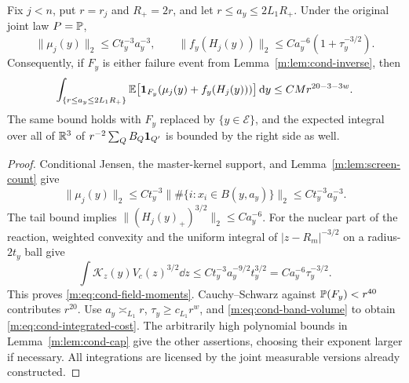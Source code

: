 \begin{lemma}\label{m:lem:cond-moments}
Fix $j<n$, put $r=r_j$ and $R_+=2r$, and let
$r\le a_y\le2L_1R_+$. Under the original joint law $P=\mathbb P$,
\begin{equation}\label{m:eq:cond-field-moments}
 \|\mu_j(y)\|_2\le Ct_y^{-3}a_y^{-3},\qquad
 \|f_y(H_j(y))\|_2
        \le Ca_y^{-6}(1+\tau_y^{-3/2}).
\end{equation}
Consequently, if $F_y$ is either failure event from
Lemma~\ref{m:lem:cond-inverse}, then
\begin{equation}\label{m:eq:cond-integrated-cost}
 \int_{\{r\le a_y\le2L_1R_+\}}
 \mathbb E\big[\mathbf 1_{F_y}(\mu_j(y)+f_y(H_j(y)))\big]\,\mathrm d y
       \le CM r^{20-3-3w}.
\end{equation}
The same bound holds with $F_y$ replaced by $\{y\in\mathcal E\}$,
and the expected integral over all of $\mathbb R^3$ of
$r^{-2}\sum_QB_Q\mathbf 1_{Q'}$ is bounded by the right side as well.
\end{lemma}

\begin{proof}
Conditional Jensen, the master-kernel support, and
Lemma~\ref{m:lem:screen-count} give
\[
 \|\mu_j(y)\|_2\le Ct_y^{-3}
       \|\#\{i:x_i\in B(y,a_y)\}\|_2
       \le Ct_y^{-3}a_y^{-3}.
\]
The tail bound implies $\|(H_j(y)_+)^{3/2}\|_2\le Ca_y^{-6}$.
For the nuclear part of the reaction, weighted convexity and the
uniform integral of $|z-R_m|^{-3/2}$ on a radius-$2t_y$ ball give
\[
 \int\mathcal K_z(y)V_c(z)^{3/2}\dd z
       \le Ct_y^{-3}a_y^{-9/2}t_y^{3/2}
       =Ca_y^{-6}\tau_y^{-3/2}.
\]
This proves \eqref{m:eq:cond-field-moments}.
Cauchy--Schwarz against $\mathbb P(F_y)<r^{40}$ contributes $r^{20}$.
Use $a_y\asymp_{L_1}r$, $\tau_y\ge c_{L_1}r^w$, and
\eqref{m:eq:cond-band-volume} to obtain
\eqref{m:eq:cond-integrated-cost}. The arbitrarily high polynomial
bounds in Lemma~\ref{m:lem:cond-cap} give the other assertions, choosing
their exponent larger if necessary. All integrations are licensed
by the joint measurable versions already constructed.
\end{proof}
